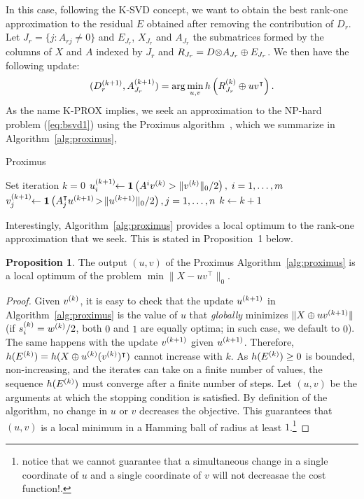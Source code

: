 \documentclass[twocolumn]{IEEEtran}
\theoremstyle{definition}
\newtheorem{proposition}{Proposition}
\def\transp{^\intercal}
\newcommand{\refeq}[1]{(\ref{#1})}
\begin{document}
In this case, following the K-SVD concept, we want to obtain the best rank-one approximation to the residual $E$ obtained after removing the contribution of $D_r$. Let $J_r = \{j: A_{rj} \neq 0 \}$ and $E_{J_r}$, $X_{J_r}$ and $A_{J_r}$ the submatrices formed by the columns of $X$ and $A$ indexed by $J_r$ and $R_{J_r}=D{\otimes}A_{J_r} \oplus E_{J_r}$. We then have the following update:
\begin{equation}
(D_r\iter{k+1},A_{J_r}\iter{k+1}) = \arg\min_{u,v} h\left( R_{J_r}\iter{k} \oplus uv\transp \right).
\label{eq:bsvd1}
\end{equation}
As the name K-PROX implies, we seek an approximation to the NP-hard problem \refeq{eq:bsvd1} using the Proximus algorithm~\cite{proximus}, which we summarize in Algorithm~\ref{alg:proximus},
%
\begin{algorithm} 
\caption{\label{alg:proximus} Proximus}
\KwResult{Vectors $u$, $v$ so that $X \approx uv\transp$}
Set iteration $k=0$\;
\Repeat {$u\iter{k}(v\iter{k})\transp = u\iter{k-1}(v\iter{k-1})\transp$} {
  $u^{(k+1)}_i\!\! \leftarrow \mathbf{1} \left( A^i v^{(k)} > \|v^{(k)}\|_0/2 \right),\;i=1,\ldots,m$ \;
  $v\iter{k+1}_j\!\! \leftarrow \indicator\left(A_j\transp{u\iter{k+1}}\!>\!\|u\iter{k+1}\|_0/2 \right),j=1,\ldots,n$ \;
  $k \leftarrow k+1 $ \;
}
\end{algorithm}
%
Interestingly, Algorithm~\ref{alg:proximus} provides a local optimum to the rank-one approximation that we seek. This is stated in Proposition~1 below.
\begin{proposition}
The output $(u,v)$ of the Proximus Algorithm~\ref{alg:proximus} is a local optimum of the problem $\min \|X - uv\transp\|_0$. 
\end{proposition}
\begin{proof}
 Given $v^{(k)}$, it is easy to check that the update $u^{(k+1)}$ in Algorithm~\ref{alg:proximus} is the value of $u$ that \emph{globally} minimizes $\|X \oplus uv^{(k+1)} \|$ (if $ s^{(k)}_i = w^{(k)}/2$, both $0$ and $1$ are equally optima; in such case, we default to $0$). The same happens with the update $v^{(k+1)}$ given $u^{(k+1)}$. Therefore, $h(E\iter{k})=h(X \oplus u\iter{k}(v\iter{k})\transp)$ cannot increase with $k$. As $h(E^{(k)}) \geq 0$ is bounded, non-increasing, and the iterates can take on a finite number of values, the sequence $h(E^{(k)})$ must converge  after a finite number of steps. Let $(u,v)$ be the arguments at which the stopping condition is satisfied. By definition of the algorithm, no change in $u$ or $v$ decreases the objective. This guarantees that $(u,v)$ is a local minimum in a Hamming ball of radius at least $1$.\footnote{notice that we cannot guarantee that a simultaneous change in a single coordinate of $u$ and a single coordinate of $v$ will not decreasae the cost function!.} 
\end{proof}
\end{document}
